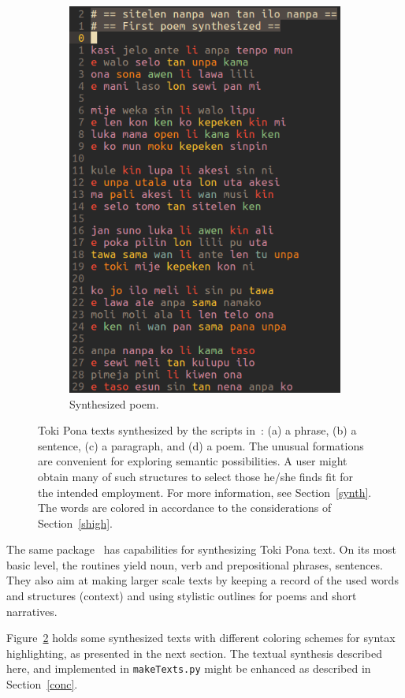\documentclass{article}
\newcommand{\tttt}[1]{\texttt{#1}}
\begin{document}
\begin{figure}
\begin{subfigure}{.7\textwidth}
        \includegraphics[width=.8\linewidth]{figs/poem_}\vspace{-0.15cm}
          \caption{Synthesized poem.}
            \label{fig:sfig2}
  \end{subfigure}
  \caption{Toki Pona texts synthesized by the scripts
  in~\cite{tokipona}: (a) a phrase, (b) a sentence, (c) a paragraph,
  and (d) a poem.
  The unusual formations are convenient for exploring semantic
  possibilities.
  A user might obtain many of such structures to select those
  he/she finds fit for the intended employment.
  For more information, see Section~\ref{synth}.
  The words are colored in accordance to the considerations
  of Section~\ref{shigh}.}
  \label{fig:syn}
\end{figure}


The same package~\cite{tokipona}
has capabilities for synthesizing Toki Pona text.
On its most basic level, the routines yield
noun, verb and prepositional phrases,
sentences.
They also aim at making larger scale texts
by keeping a record of the used words and structures (context)
and using stylistic outlines for poems and short narratives.

Figure~\ref{fig:syn} holds some synthesized texts
with different coloring schemes for syntax highlighting,
as presented in the next section.
The textual synthesis described here,
and implemented in \tttt{makeTexts.py}
might be enhanced as described in Section~\ref{conc}.
\end{document}
